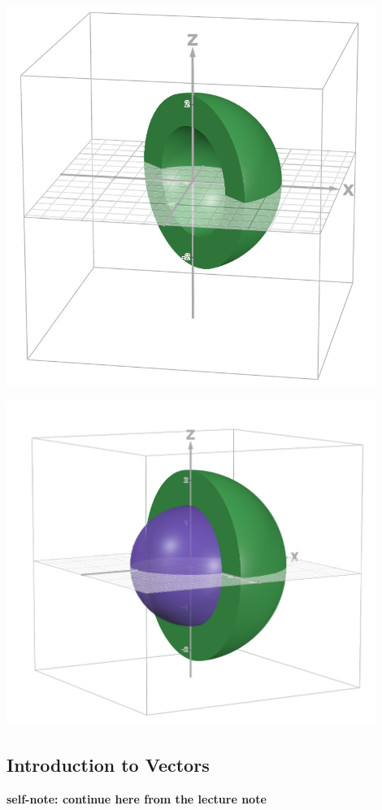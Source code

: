 \documentclass{article}
\begin{document}
\begin{examplebox}
\begin{solutionbox}
\begin{center}
\begin{minipage}{0.3\textwidth}
                \includegraphics[width=0.9\textwidth]{region between 2 see thru.png}
                \captionsetup{justification=centerlast}
            \end{minipage}%
            \hfill
            \begin{minipage}{0.3\textwidth}
                \centering
                \includegraphics[width=0.9\textwidth]{region between 2 see thru with inner sphere.png}
                \captionsetup{justification=centerlast}
            \end{minipage}
        \end{center}        
    \end{solutionbox}
\end{examplebox}

\subsection*{Introduction to Vectors}

\textbf{self-note: continue here from the lecture note}
\end{document}
